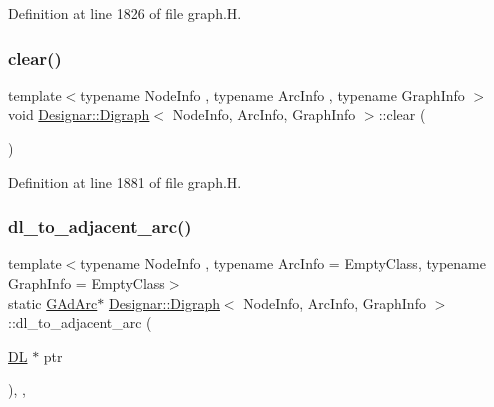Definition at line 1826 of file graph.\+H.

\mbox{\label{class_designar_1_1_digraph_a1ec067a8df6129b27e4d79c9c2755899}} 
\subsubsection{\texorpdfstring{clear()}{clear()}}
{\footnotesize\ttfamily template$<$typename Node\+Info , typename Arc\+Info , typename Graph\+Info $>$ \\
void \hyperlink{class_designar_1_1_digraph}{Designar\+::\+Digraph}$<$ Node\+Info, Arc\+Info, Graph\+Info $>$\+::clear (\begin{DoxyParamCaption}{ }\end{DoxyParamCaption})}



Definition at line 1881 of file graph.\+H.

\mbox{\label{class_designar_1_1_digraph_afe3162bf2e56b177e7ee1a938ae2af8b}} 
\subsubsection{\texorpdfstring{dl\+\_\+to\+\_\+adjacent\+\_\+arc()}{dl\_to\_adjacent\_arc()}}
{\footnotesize\ttfamily template$<$typename Node\+Info , typename Arc\+Info  = Empty\+Class, typename Graph\+Info  = Empty\+Class$>$ \\
static \hyperlink{class_designar_1_1_digraph_a0c6d846f23d1e82556fb6055557df53f}{G\+Ad\+Arc}$\ast$ \hyperlink{class_designar_1_1_digraph}{Designar\+::\+Digraph}$<$ Node\+Info, Arc\+Info, Graph\+Info $>$\+::dl\+\_\+to\+\_\+adjacent\+\_\+arc (\begin{DoxyParamCaption}\item[{\hyperlink{class_designar_1_1_d_l}{DL} $\ast$}]{ptr }\end{DoxyParamCaption})\hspace{0.3cm}{\ttfamily [inline]}, {\ttfamily [static]}, {\ttfamily [protected]}}




